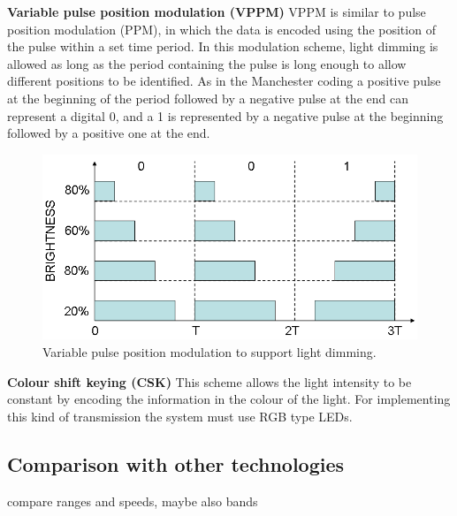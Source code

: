 \textbf{Variable pulse position modulation (VPPM)}\newline
VPPM is similar to pulse position modulation (PPM), in which the data is encoded using the position of the pulse within a set time period.
In this modulation scheme, light dimming is allowed as long as the period containing the pulse is long enough to allow different positions to be identified. 
As in the Manchester coding a positive pulse at the beginning of the period followed by a negative pulse at the end can represent a digital 0, and a 1 is represented by a negative pulse at the beginning followed by a positive one at the end.\\
\newline
\begin{figure}[H]
\centering
\includegraphics[scale=0.3]{img/VPPM}
\caption{Variable pulse position modulation to support light dimming.}
\label{fig:ookmod}
\end{figure}
\textbf{Colour shift keying (CSK)}\newline
This scheme allows the light intensity to be constant by encoding the information in the colour of the light.
For implementing this kind of transmission the system must use RGB type LEDs.

\subsection{Comparison with other technologies}
compare ranges and speeds, maybe also bands